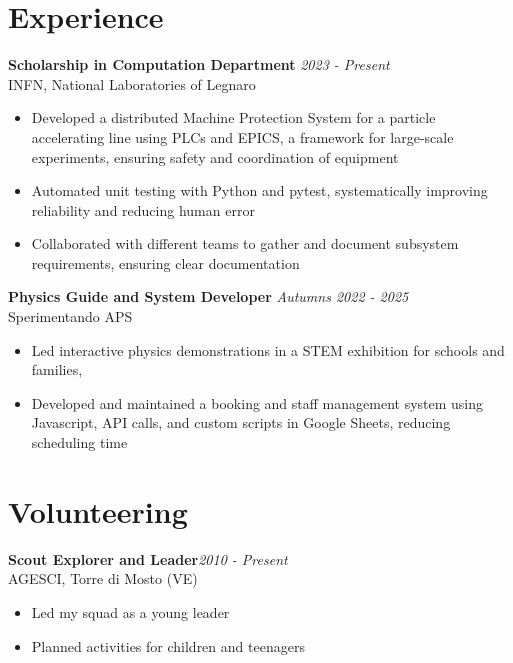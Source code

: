 \documentclass[a4paper,10pt]{article}
\begin{document}
\begin{minipage}[t]{0.58\textwidth}
    \section*{Experience}
        \textbf{Scholarship in Computation Department}  \hfill \textit{2023 - Present} \\
        INFN, National Laboratories of Legnaro
        \vspace{-0.1cm}
        \begin{itemize}[left=0.2cm, label={\textbullet}, itemsep=0cm]
            \item Developed a distributed Machine Protection System for a particle accelerating line using PLCs and EPICS, a framework for large-scale experiments, ensuring safety and coordination of equipment
            \item Automated unit testing with Python and pytest, systematically improving reliability and reducing human error
            \item Collaborated with different teams to gather and document subsystem requirements, ensuring clear documentation
        \end{itemize}
        \vspace{0.2cm}
        
        \textbf{Physics Guide and System Developer}  \hfill \textit{Autumns 2022 - 2025} \\
        Sperimentando APS 
        \vspace{-0.1cm}
        \begin{itemize}[left=0.2cm, label={\textbullet}, itemsep=0cm]
            \item Led interactive physics demonstrations in a STEM exhibition for schools and families, 
            \item Developed and maintained a booking and staff management system using Javascript, API calls, and custom scripts in Google Sheets, reducing scheduling time 
        \end{itemize}

    \section*{Volunteering}
        \textbf{Scout Explorer and Leader}\hfill \textit{2010 - Present} \\
        AGESCI, Torre di Mosto (VE)
        \vspace{-0.1cm}
        \begin{itemize}[left=0.2cm, label={\textbullet}, itemsep=0cm]
            \item Led my squad as a young leader
            \item Planned activities for children and teenagers
        \end{itemize}
\end{minipage}

\vfill
\end{document}
